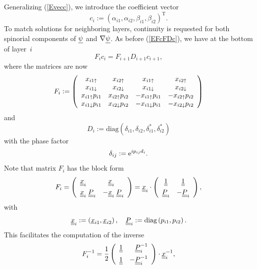 Generalizing (\ref{Evecc}),
we introduce the coefficient vector
\begin{equation}
  c_i := {(\alpha_{i1}, \alpha_{i2}, \beta_{i1}, \beta_{i2})}^\text{T}.
\end{equation}
To match solutions for neighboring layers,
continuity is requested for both spinorial components
of $\underline{\psi}$ and $\mathbf{\nabla}\underline{\psi}$.
As before (\ref{EFcFDc}), we have at the bottom of layer~$i$
\begin{equation}\label{EFcFDcp}
  F_i c_i = F_{i+1} D_{i+1} c_{i+1},
\end{equation}
where the matrices are now
\begin{equation}
  F_i := \left(\begin{array}{cccc}
    x_{i1\uparrow}      &x_{i2\uparrow}     &x_{i1\uparrow}       &x_{i2\uparrow}       \\
    x_{i1\downarrow}      &x_{i2\downarrow}     &x_{i1\downarrow}       &x_{i2\downarrow}       \\
    x_{i1\uparrow}p_{i1}&x_{i2\uparrow}p_{i2}&-x_{i1\uparrow}p_{i1}&-x_{i2\uparrow}p_{i2}\\
    x_{i1\downarrow}p_{i1}&x_{i2\downarrow}p_{i2}&-x_{i1\downarrow}p_{i1}&-x_{i2\downarrow}p_{i2}
  \end{array}\right)
\end{equation}
and
\begin{equation}
  D_i := \text{diag}(\delta_{i1}, \delta_{i2}, \delta_{i1}^*, \delta_{i2}^*)
\end{equation}
with the phase factor
\begin{equation}
   \delta_{ij} := {\rm e}^{ip_{ij}d_i}.
\end{equation}
Note that matrix $F_i$ has the block form
\begin{equation}
  F_i
  =\left(\begin{array}{ll}\underline{\underline{x}}_i&\hphantom{-}\underline{\underline{x}}_i\\[1ex]
    \underline{\underline{x}}_i\; \underline{\underline{P}}_i&-\underline{\underline{x}}_i\; \underline{\underline{P}}_i\end{array}\right)
    = \underline{\underline{x}}_i \cdot
    \left(\begin{array}{cc}\underline{\underline{1}}&\underline{\underline{1}}\\[1ex]
    \underline{\underline{P}}_i&-\underline{\underline{P}}_i\end{array}\right),
\end{equation}
with
\begin{equation}
  \underline{\underline{x}}_i :=
  \left(\underline{x}_{i1}, \underline{x}_{i2}\right),
  \quad
  \underline{\underline{P}}_i :=
  \text{diag}\left(p_{i1},p_{i2}\right).
\end{equation}
This facilitates the computation of the inverse
\begin{equation}
  F_i^{-1}
    = \frac{1}{2}
    \left(\begin{array}{cc}\underline{\underline{1}}&\hphantom{-}\underline{\underline{P}}_i^{-1}\\[1.2ex]
      \underline{\underline{1}} &-\underline{\underline{P}}_i^{-1}\end{array}\right)
      \cdot\underline{\underline{x}}_i^{-1},
\end{equation}
